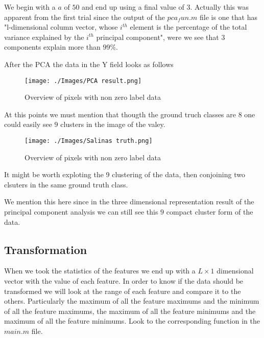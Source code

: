 \documentclass[12pt, a4paper]{article}
\begin{document}
We begin with a $a$ of $50$ and end up using a final value of $3$. Actually this was apparent from the first trial since the output of the $pca_fun.m$ file is one that has "l-dimensional column vector, whose $i^{th}$ element is the percentage of the total variance explained by the $i^{th}$ principal component", were we see that $3$ components explain more than $99\%$.
\newline

After the PCA the data in the Y field looks as follows
\newline

\begin{figure}[H]
    \begin{center}
        \texttt{[image: ./Images/PCA result.png]}
    \end{center}
    \caption{Overview of pixels with non zero label data}\label{fig:pcares}
\end{figure}

At this points we must mention that thougth the ground truch classes are $8$ one could easily see $9$ clusters in the image of the valey.
\newline

\begin{figure}[H]
    \begin{center}
        \texttt{[image: ./Images/Salinas truth.png]}
    \end{center}
    \caption{Overview of pixels with non zero label data}\label{fig:nine}
\end{figure}

It might be worth exploting the 9 clustering of the data, then conjoining two clsuters in the same ground truth class.
\newline

We mention this here since in the three dimensional representation result of the principal component analysis we can still see this $9$ compact cluster form of the data.
\newline

\subsection{Transformation}

When we took the statistics of the features we end up with a $L\times1$ dimensional vector with the value of each feature. In order to know if the data should be transformed we will look at the range of each feature and compare it to the others. Particularly the maximum of all the feature maximums and the minimum of all the feature maximums, the maximum of all the feature minimums and the maximum of all the feature minimums. Look to the corresponding function in the $main.m$ file.
\newline
\end{document}
